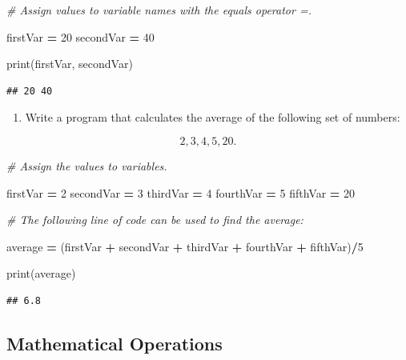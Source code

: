 \documentclass[
]{book}
\newenvironment{Shaded}{\begin{snugshade}}{\end{snugshade}}
\newcommand{\BuiltInTok}[1]{#1}
\newcommand{\CommentTok}[1]{\textcolor[rgb]{0.56,0.35,0.01}{\textit{#1}}}
\newcommand{\DecValTok}[1]{\textcolor[rgb]{0.00,0.00,0.81}{#1}}
\newcommand{\NormalTok}[1]{#1}
\newcommand{\OperatorTok}[1]{\textcolor[rgb]{0.81,0.36,0.00}{\textbf{#1}}}
\providecommand{\tightlist}{%
  \setlength{\itemsep}{0pt}\setlength{\parskip}{0pt}}
\begin{document}
\begin{Shaded}
\begin{Highlighting}[]
\CommentTok{\# Assign values to variable names with the \textquotesingle{}equals\textquotesingle{} operator \textquotesingle{}=\textquotesingle{}.}

\NormalTok{firstVar }\OperatorTok{=} \DecValTok{20}
\NormalTok{secondVar }\OperatorTok{=} \DecValTok{40}

\BuiltInTok{print}\NormalTok{(firstVar, secondVar)}
\end{Highlighting}
\end{Shaded}

\begin{verbatim}
## 20 40
\end{verbatim}

\begin{enumerate}
\def\labelenumi{\arabic{enumi}.}
\setcounter{enumi}{2}
\tightlist
\item
  Write a program that calculates the average of the following set of numbers:
\end{enumerate}

\[ 2,3,4,5,20.\]

\begin{Shaded}
\begin{Highlighting}[]
\CommentTok{\# Assign the values to variables.}

\NormalTok{firstVar }\OperatorTok{=} \DecValTok{2}
\NormalTok{secondVar }\OperatorTok{=} \DecValTok{3}
\NormalTok{thirdVar }\OperatorTok{=} \DecValTok{4}
\NormalTok{fourthVar }\OperatorTok{=} \DecValTok{5}
\NormalTok{fifthVar }\OperatorTok{=} \DecValTok{20}

\CommentTok{\# The following line of code can be used to find the average:}

\NormalTok{average }\OperatorTok{=}\NormalTok{ (firstVar }\OperatorTok{+}\NormalTok{ secondVar }\OperatorTok{+}\NormalTok{ thirdVar }\OperatorTok{+}\NormalTok{ fourthVar }\OperatorTok{+}\NormalTok{ fifthVar)}\OperatorTok{/}\DecValTok{5}

\BuiltInTok{print}\NormalTok{(average)}
\end{Highlighting}
\end{Shaded}

\begin{verbatim}
## 6.8
\end{verbatim}

\hypertarget{mathematical-operations}{%
\subsection{Mathematical Operations}\label{mathematical-operations}}
\end{document}
